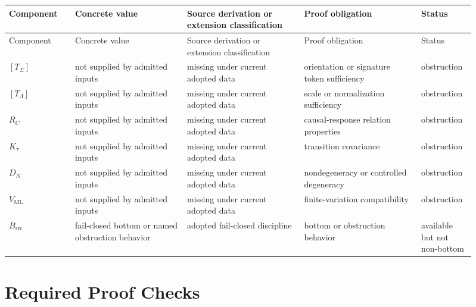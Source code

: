 \documentclass[11pt]{article}
\begin{document}
\begin{longtable}{p{0.13\linewidth}p{0.22\linewidth}p{0.23\linewidth}p{0.23\linewidth}p{0.10\linewidth}}
\toprule
Component & Concrete value & Source derivation or extension classification & Proof obligation & Status \\
\midrule
\endfirsthead
\toprule
Component & Concrete value & Source derivation or extension classification & Proof obligation & Status \\
\midrule
\endhead
\([T_{\Sigma}]\) & not supplied by admitted inputs & missing under current adopted data & orientation or signature token sufficiency & obstruction \\
\([T_{\Lambda}]\) & not supplied by admitted inputs & missing under current adopted data & scale or normalization sufficiency & obstruction \\
\(R_C\) & not supplied by admitted inputs & missing under current adopted data & causal-response relation properties & obstruction \\
\(K_{\tau}\) & not supplied by admitted inputs & missing under current adopted data & transition covariance & obstruction \\
\(D_N\) & not supplied by admitted inputs & missing under current adopted data & nondegeneracy or controlled degeneracy & obstruction \\
\(V_{\mathrm{ML}}\) & not supplied by admitted inputs & missing under current adopted data & finite-variation compatibility & obstruction \\
\(B_{\mathrm{src}}\) & fail-closed bottom or named obstruction behavior & adopted fail-closed discipline & bottom or obstruction behavior & available but not non-bottom \\
\bottomrule
\end{longtable}

\section{Required Proof Checks}
\end{document}
